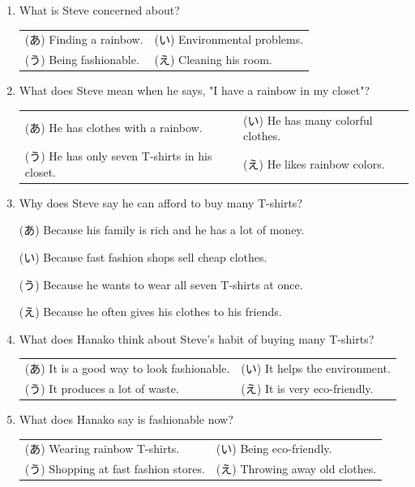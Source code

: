 \begin{enumerate}
  \item What is Steve concerned about?\par
    \begin{tabular}{l l}
      (あ) Finding a rainbow.&(い) Environmental problems.\\
      (う) Being fashionable.&(え) Cleaning his room.\\
    \end{tabular}
  \bigskip
  \item What does Steve mean when he says, "I have a rainbow in my closet"?\par
    \begin{tabular}{l l}
      (あ) He has clothes with a rainbow.&(い) He has many colorful clothes.\\
      (う) He has only seven T-shirts in his closet.&(え) He likes rainbow colors.\\
    \end{tabular}
  \bigskip
  \item Why does Steve say he can afford to buy many T-shirts?\par\:
      (あ) Because his family is rich and he has a lot of money.\par\:
      (い) Because fast fashion shops sell cheap clothes.\par\:
      (う) Because he wants to wear all seven T-shirts at once.\par\:
      (え) Because he often gives his clothes to his friends.
  \bigskip
  \item What does Hanako think about Steve's habit of buying many T-shirts?\par
    \begin{tabular}{l l}
      (あ) It is a good way to look fashionable.&(い) It helps the environment.\\
      (う) It produces a lot of waste.&(え) It is very eco-friendly.\\
    \end{tabular}
  \bigskip
  \item What does Hanako say is fashionable now?\par
    \begin{tabular}{l l}
      (あ) Wearing rainbow T-shirts.&(い) Being eco-friendly.\\
      (う) Shopping at fast fashion stores.&(え) Throwing away old clothes.\\
    \end{tabular}
\end{enumerate}

